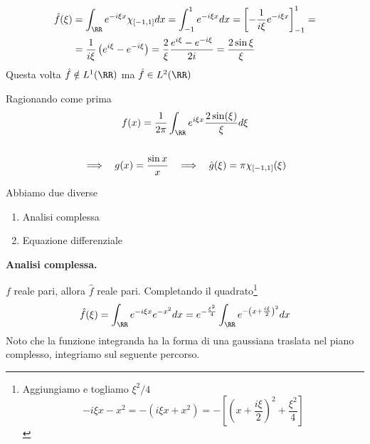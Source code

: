 \Soluzione

\begin{equation*}
\begin{aligned}
\hat{f} (\xi) & = \int_{\RR} e^{- i\xi x} \chi_{[ - 1, 1]} dx = \int^{1}_{- 1} e^{- i\xi x} dx = \left[ - \frac{1}{i\xi} e^{- i\xi x}\right]^{1}_{- 1} = \\
 & = \frac{1}{i\xi}\left(e^{i\xi} - e^{- i\xi}\right) = \frac{2}{\xi}\frac{e^{i\xi} - e^{- i\xi}}{2i} = \frac{2\sin \xi}{\xi}
\end{aligned}
\end{equation*}
Questa volta $\hat{f} \notin L^{1} (\RR)$ ma $\hat{f} \in L^{2} (\RR)$

Ragionando come prima
\begin{gather*}
f(x) = \frac{1}{2\pi}\int_{\RR} e^{i\xi x}\frac{2\sin(\xi)}{\xi} d\xi \\
\\
\implies \ \ g(x) = \frac{\sin x}{x} \ \ \implies \ \ \hat{g}(\xi) = \pi \chi_{[ - 1, 1]} (\xi)
\end{gather*}

\Soluzione

Abbiamo due diverse
\begin{enumerate}
\item Analisi complessa
\item Equazione differenziale
\end{enumerate}

\textbf{Analisi complessa.}

$f$ reale pari, allora $\hat{f}$ reale pari. Completando il quadrato\footnote{Aggiungiamo e togliamo $\xi^{2} /4$
\begin{equation*}
- i\xi x - x^{2} = - \left(i\xi x + x^{2}\right) = - \left[\left(x + \frac{i\xi}{2}\right)^{2} + \frac{\xi^{2}}{4}\right]
\end{equation*}
}
\begin{equation*}
\hat{f} (\xi) = \int_{\RR} e^{- i\xi x} e^{- x^{2}} dx = e^{- \frac{\xi^{2}}{4}}\int_{\RR} e^{- \left(x + \frac{i\xi}{2}\right)^{2}} dx
\end{equation*}
Noto che la funzione integranda ha la forma di una gaussiana traslata nel piano complesso, integriamo sul seguente percorso.


